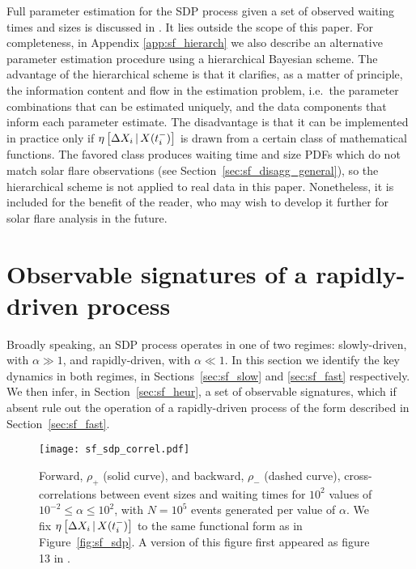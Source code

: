 Full parameter estimation for the SDP process given a set of observed waiting times and sizes is discussed in \citet{Melatos2019}. It lies outside the scope of this paper. For completeness, in Appendix \ref{app:sf_hierarch} we also describe an alternative parameter estimation procedure using a hierarchical Bayesian scheme. The advantage of the hierarchical scheme is that it clarifies, as a matter of principle, the information content and flow in the estimation problem, i.e.~the parameter combinations that can be estimated uniquely, and the data components that inform each parameter estimate. The disadvantage is that it can be implemented in practice only if $\eta\left[\Delta X_{i}\,|\,X(t_i^-)\right]$ is drawn from a certain class of mathematical functions. The favored class produces waiting time and size PDFs which do not match solar flare observations (see Section~\ref{sec:sf_disagg_general}), so the hierarchical scheme is not applied to real data in this paper. Nonetheless, it is included for the benefit of the reader, who may wish to develop it further for solar flare analysis in the future.

\section{Observable signatures of a rapidly-driven process} \label{sec:sf_pred}
Broadly speaking, an SDP process operates in one of two regimes: slowly-driven, with $\alpha \gg 1$, and rapidly-driven, with $\alpha \ll 1$. In this section we identify the key dynamics in both regimes, in Sections~\ref{sec:sf_slow} and \ref{sec:sf_fast} respectively. We then infer, in Section~\ref{sec:sf_heur}, a set of observable signatures, which if absent rule out the operation of a rapidly-driven process of the form described in Section~\ref{sec:sf_fast}.

\begin{figure}
\centering
\texttt{[image: sf\_sdp\_correl.pdf]}
\caption{Forward, $\rho_+$ (solid curve), and backward, $\rho_-$ (dashed curve), cross-correlations between event sizes and waiting times for $10^2$ values of $10^{-2} \leq \alpha \leq 10^2$, with $N=10^5$ events generated per value of $\alpha$. We fix $\eta\left[\Delta X_{i}\,|\,X(t_i^-)\right]$ to the same functional form as in Figure~\ref{fig:sf_sdp}. A version of this figure first appeared as figure 13 in \citet{Fulgenzi2017}.}
\label{fig:sf_sdp_correl}
\end{figure}


